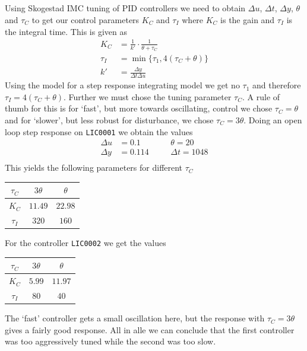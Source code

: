 \documentclass[a4paper]{scrartcl}
\begin{document}
\subsection{}
Using Skogestad IMC tuning of PID controllers we need to obtain $\Delta u$, $\Delta t$, $\Delta y$, $\theta$ and $\tau_C$ to get our control parameters $K_C$ and $\tau_I$ where $K_C$ is the gain and $\tau_I$ is the integral time. This is given as 
\begin{equation}\label{eq:SIMC}
	\begin{aligned}
		K_C &= \frac{1}{k'} \cdot \frac{1}{\theta + \tau_C}\\
		\tau_I &= \min\{\tau_1 , 4(\tau_C + \theta)\}\\
		k' &= \frac{\Delta y }{\Delta t \Delta u}
	\end{aligned}
\end{equation}
Using the model for a step response integrating model we get no $\tau_1$ and therefore $\tau_I = 4(\tau_C + \theta)$. Further we must chose the tuning parameter $\tau_C$. A rule of thumb for this is for `fast', but more towards oscillating, control we chose $\tau_C = \theta$ and for `slower', but less robust for disturbance, we chose $\tau_C = 3\theta$. Doing an open loop step response on \texttt{LIC0001} we obtain the values
\begin{equation}
	\begin{aligned}
		\Delta u &= 0.1 \quad &&\theta = 20\\
		\Delta y &= 0.114 \quad &&\Delta t = 1048\\
	\end{aligned}
\end{equation}
This yields the following parameters for different $\tau_C$
\begin{center}
	\begin{tabular}{c|c|c}
		$\tau_C$ & $3\theta$ & $\theta$ \\
		\hline
		$K_C$ & $11.49$ & $ 22.98$\\
		$\tau_I$ & $320$ & $160$
	\end{tabular}
\end{center}

For the controller \texttt{LIC0002} we get the values
\begin{center}
	\begin{tabular}{c|c|c}
		$\tau_C$ & $3\theta$ & $\theta$ \\
		\hline
		$K_C$ & $5.99$ & $11.97$\\
		$\tau_I$ & $80$ & $40$
	\end{tabular}
\end{center}
The `fast' controller gets a small oscillation here, but the response with $\tau_C = 3\theta$ gives a fairly good response. All in alle we can conclude that the first controller was too aggressively tuned while the second was too slow. 
\end{document}
